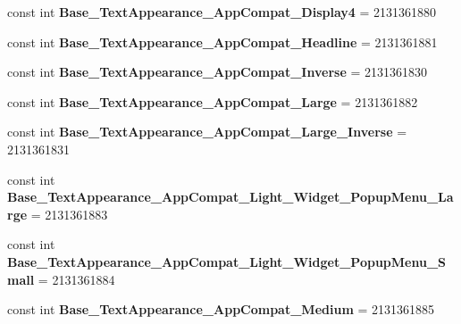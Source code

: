 \begin{DoxyCompactItemize}
const int {\bfseries Base\+\_\+\+Text\+Appearance\+\_\+\+App\+Compat\+\_\+\+Display4} = 2131361880
\item 
\mbox{\label{class_pinned_app_1_1_droid_1_1_resource_1_1_style_acfe62fce1cdfa3329f6595dd6a8d3816}} 
const int {\bfseries Base\+\_\+\+Text\+Appearance\+\_\+\+App\+Compat\+\_\+\+Headline} = 2131361881
\item 
\mbox{\label{class_pinned_app_1_1_droid_1_1_resource_1_1_style_af2aa7cf393140089679df0342057f07c}} 
const int {\bfseries Base\+\_\+\+Text\+Appearance\+\_\+\+App\+Compat\+\_\+\+Inverse} = 2131361830
\item 
\mbox{\label{class_pinned_app_1_1_droid_1_1_resource_1_1_style_a84100b7b9ba7bec26cde1a72964f23ef}} 
const int {\bfseries Base\+\_\+\+Text\+Appearance\+\_\+\+App\+Compat\+\_\+\+Large} = 2131361882
\item 
\mbox{\label{class_pinned_app_1_1_droid_1_1_resource_1_1_style_a75329ca9fec296636b1be24f0c984d8f}} 
const int {\bfseries Base\+\_\+\+Text\+Appearance\+\_\+\+App\+Compat\+\_\+\+Large\+\_\+\+Inverse} = 2131361831
\item 
\mbox{\label{class_pinned_app_1_1_droid_1_1_resource_1_1_style_a9f99c922b38e485bc37868aeefd191f2}} 
const int {\bfseries Base\+\_\+\+Text\+Appearance\+\_\+\+App\+Compat\+\_\+\+Light\+\_\+\+Widget\+\_\+\+Popup\+Menu\+\_\+\+Large} = 2131361883
\item 
\mbox{\label{class_pinned_app_1_1_droid_1_1_resource_1_1_style_a39e3cfe268f5be49358f06fe3e03f0ac}} 
const int {\bfseries Base\+\_\+\+Text\+Appearance\+\_\+\+App\+Compat\+\_\+\+Light\+\_\+\+Widget\+\_\+\+Popup\+Menu\+\_\+\+Small} = 2131361884
\item 
\mbox{\label{class_pinned_app_1_1_droid_1_1_resource_1_1_style_a563480f74a64adf15beeb09e290442fb}} 
const int {\bfseries Base\+\_\+\+Text\+Appearance\+\_\+\+App\+Compat\+\_\+\+Medium} = 2131361885
\item 

\end{DoxyCompactItemize}
